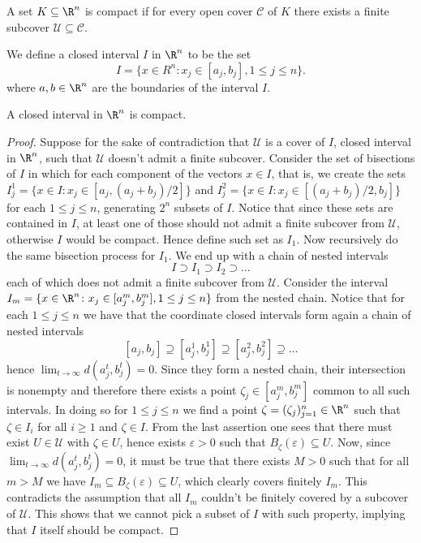 \begin{definition}
A set \(K \subseteq \R^n\) is compact if for every open cover \(\mathcal C\)
of \(K\) there exists a finite subcover \(\mathcal U \subseteq \mathcal C\).
\end{definition}

\begin{definition}
We define a closed interval \(I\) in \(\R^n\) to be the set
\[
I = \{x \in R^n \colon x_j \in [a_j, b_j], 1 \leq j \leq n\}.
\]
where \(a, b \in \R^n\) are the boundaries of the interval \(I\).
\end{definition}

\begin{proposition}\label{prop: closed-interval compact}
A closed interval in \(\R^n\) is compact.
\end{proposition}

\begin{proof}
Suppose for the sake of contradiction that \(\mathcal U\) is a cover of \(I\),
closed interval in \(\R^n\), such that \(\mathcal U\) doesn't admit a finite
subcover. Consider the set of bisections of \(I\) in which for each component
of the vectors \(x \in I\), that is, we create the sets \(I_j^1 = \{x \in I \colon
x_j \in [a_j, (a_j + b_j)/2]\}\) and \(I_j^2 = \{x \in I \colon x_j \in [(a_j +
b_j)/2, b_j]\}\) for each \(1 \leq j \leq n\), generating \(2^n\) subsets of
\(I\). Notice that since these sets are contained in \(I\), at least one of
those should not admit a finite subcover from \(\mathcal U\), otherwise \(I\)
would be compact. Hence define such set as \(I_1\). Now recursively do the
same bisection process for \(I_1\). We end up with a chain of nested intervals
\[
I \supset I_1 \supset I_2 \supset \dots
\]
each of which does not admit a finite subcover from \(\mathcal U\). Consider
the interval \(I_m = \{x \in \R^n \colon x_j \in [a^m_j, b_j^m], 1 \leq j \leq n\}\)
from the nested chain. Notice that for each \(1 \leq j \leq n\) we have that
the coordinate closed intervals form again a chain of nested intervals
\[
[a_j, b_j] \supseteq [a_j^1, b_j^1] \supseteq [a_j^2, b_j^2] \supseteq \dots
\]
hence \(\lim_{t \to \infty} d(a_j^t, b_j^t) = 0\). Since they form a nested
chain, their intersection is nonempty and therefore there exists a point
\(\zeta_j \in  [a_j^m, b_j^m]\) common to all such intervals. In doing so for
\(1 \leq j \leq n\) we find a point \(\zeta = (\zeta_j)_{j=1}^n \in \R^n\)
such that \(\zeta \in I_i\) for all \(i \geq 1\) and \(\zeta \in I\). From the
last assertion one sees that there must exist \(U \in \mathcal U\) with
\(\zeta \in U\), hence exists \(\varepsilon > 0\) such that
\(B_\zeta(\varepsilon) \subseteq U\). Now, since \(\lim_{t \to \infty}
d(a_j^t, b_j^t) = 0\), it must be true that there exists \(M > 0\) such that
for all \(m > M\) we have \(I_m \subseteq B_\zeta(\varepsilon) \subseteq U\),
which clearly covers finitely \(I_m\). This contradicts the assumption that
all \(I_m\) couldn't be finitely covered by a subcover of \(\mathcal U\). This
shows that we cannot pick a subset of \(I\) with such property, implying that
\(I\) itself should be compact.
\end{proof}

